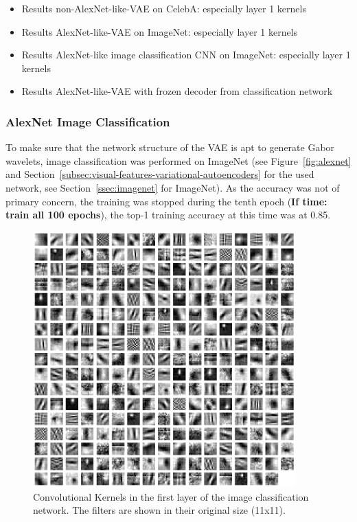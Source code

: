 \documentclass[11pt]{article}
\begin{document}
    \begin{itemize}
        \item Results non-AlexNet-like-VAE on CelebA: especially layer 1 kernels
        \item Results AlexNet-like-VAE on ImageNet: especially layer 1 kernels
        \item Results AlexNet-like image classification CNN on ImageNet: especially layer 1 kernels
        \item Results AlexNet-like-VAE with frozen decoder from classification network
    \end{itemize}

    \subsubsection{AlexNet Image Classification}
    To make sure that the network structure of the \ac{VAE} is apt to generate Gabor wavelets, image classification was performed on ImageNet (see Figure~\ref{fig:alexnet} and Section~\ref{subsec:visual-features-variational-autoencoders} for the used network, see Section~\ref{ssec:imagenet} for ImageNet).
    As the accuracy was not of primary concern, the training was stopped during the tenth epoch (\textbf{If time: train all 100 epochs}), the top-1 training accuracy at this time was at 0.85.

    \begin{figure}
        \centering
        \includegraphics[width=0.9\textwidth]{images/alexnet_classification_l1_kernels.png}
        \caption[Image classification - Layer 1 Kernels]{Convolutional Kernels in the first layer of the image classification network. The filters are shown in their original size (11x11).}
        \label{fig:classification_layer1_kernels}
    \end{figure}
\end{document}
